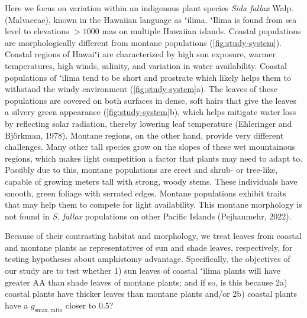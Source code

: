 \documentclass[
  letterpaper,
  DIV=11,
  numbers=noendperiod]{scrartcl}
\begin{document}
Here we focus on variation within an indigenous plant species \emph{Sida
fallax} Walp. (Malvaceae), known in the Hawaiian language as ʻilima.
ʻIlima is found from sea level to elevations \(>1000\) mas on multiple
Hawaiian islands. Coastal populations are morphologically different from
montane populations (\autoref{fig:study-system}). Coastal regions of
Hawaiʻi are characterized by high sun exposure, warmer temperatures,
high winds, salinity, and variation in water availability. Coastal
populations of ʻilima tend to be short and prostrate which likely helps
them to withstand the windy environment (\autoref{fig:study-system}a).
The leaves of these populations are covered on both surfaces in dense,
soft hairs that give the leaves a silvery green appearance
(\autoref{fig:study-system}b), which helps mitigate water loss by
reflecting solar radiation, thereby lowering leaf temperature
(Ehleringer and Björkman, 1978). Montane regions, on the other hand,
provide very different challenges. Many other tall species grow on the
slopes of these wet mountainous regions, which makes light competition a
factor that plants may need to adapt to. Possibly due to this, montane
populations are erect and shrub- or tree-like, capable of growing meters
tall with strong, woody stems. These individuals have smooth, green
foliage with serrated edges. Montane populations exhibit traits that may
help them to compete for light availability. This montane morphology is
not found in \emph{S. fallax} populations on other Pacific Islands
(Pejhanmehr, 2022).

Because of their contrasting habitat and morphology, we treat leaves
from coastal and montane plants as representatives of sun and shade
leaves, respectively, for testing hypotheses about amphistomy advantage.
Specifically, the objectives of our study are to test whether 1) sun
leaves of coastal ʻilima plants will have greater \(\mathrm{AA}\) than
shade leaves of montane plants; and if so, is this because 2a) coastal
plants have thicker leaves than montane plants and/or 2b) coastal plants
have a \(g_{\mathrm{smax,ratio}}\) closer to 0.5?
\end{document}
